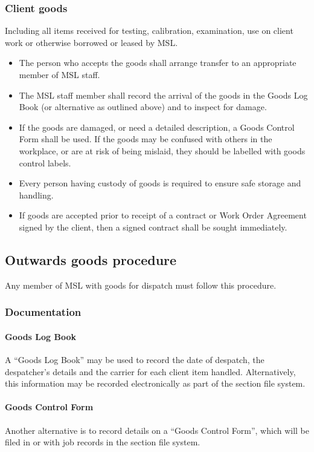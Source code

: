 \subsubsection{Client goods}
Including all items received for testing, calibration, examination, use on client work or otherwise borrowed or leased by MSL. 
\begin{itemize}
\item The person who accepts the goods shall arrange transfer to an appropriate member of MSL staff.
\item The MSL staff member shall record the arrival of the goods in the Goods Log Book (or alternative as outlined above) and to inspect for damage.
\item If the goods are damaged, or need a detailed description, a Goods Control Form shall be used. If the goods may be confused with others in the workplace, or are at risk of being mislaid, they should be labelled with goods control labels. 
\item Every person having custody of goods is required to ensure safe storage and handling. 
\item If goods are accepted prior to receipt of a contract or Work Order Agreement signed by the client, then a signed contract shall be sought immediately.
\end{itemize} 

\subsection{Outwards goods procedure}
Any member of MSL with goods for dispatch must follow this procedure.

\subsubsection{Documentation}
\paragraph{Goods Log Book}
A ``Goods Log Book'' may be used to record the date of despatch, the despatcher's details and the carrier for each client item handled. Alternatively, this information may be recorded electronically as part of the section file system.

\paragraph{Goods Control Form}
Another alternative is to record details on a ``Goods Control Form'', which will be filed in  or with job records in the section file system.


